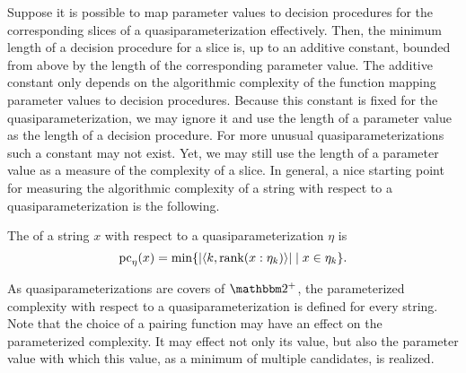 Suppose it is possible to map parameter values to decision procedures for the corresponding slices of a quasiparameterization effectively.
Then, the minimum length of a decision procedure for a slice is, up to an additive constant, bounded from above by the length of the corresponding parameter value.
The additive constant only depends on the algorithmic complexity of the function mapping parameter values to decision procedures.
Because this constant is fixed for the quasiparameterization, we may ignore it and use the length of a parameter value as the length of a decision procedure.
For more unusual quasiparameterizations such a constant may not exist.
Yet, we may still use the length of a parameter value as a measure of the complexity of a slice.
In general, a nice starting point for measuring the algorithmic complexity of a string with respect to a quasiparameterization is the following.
\begin{definition}
  The  of a string $x$ with respect to a quasiparameterization $\eta$ is
  \begin{equation*}
    \operatorname{pc}_\eta(x) = \min\{{\lvert{\langle k, \operatorname{rank}(x : \eta_k)\rangle}\rvert} \;|\; x \in \eta_k\}.
  \end{equation*}
\end{definition}
As quasiparameterizations are covers of $\binary^+$, the parameterized complexity with respect to a quasiparameterization is defined for every string.
Note that the choice of a pairing function may have an effect on the parameterized complexity.
It may effect not only its value, but also the parameter value with which this value, as a minimum of multiple candidates, is realized.

